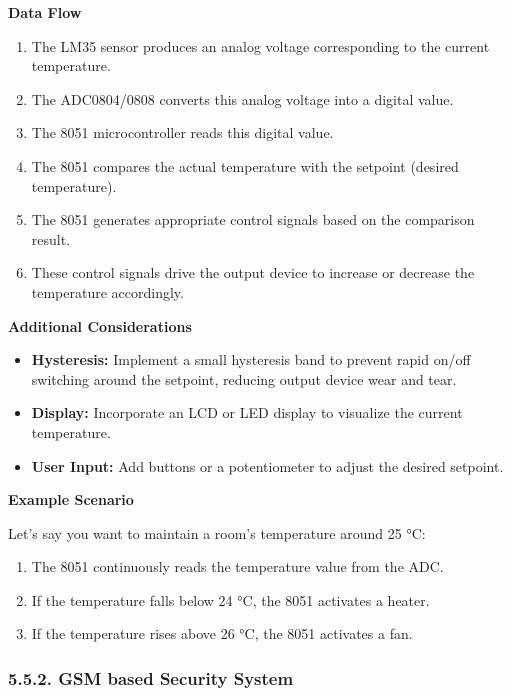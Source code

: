 \documentclass[
]{article}
\begin{document}
\textbf{Data Flow}

\begin{enumerate}
\def\labelenumi{\arabic{enumi}.}
\item
  The LM35 sensor produces an analog voltage corresponding to the
  current temperature.
\item
  The ADC0804/0808 converts this analog voltage into a digital value.
\item
  The 8051 microcontroller reads this digital value.
\item
  The 8051 compares the actual temperature with the setpoint (desired
  temperature).
\item
  The 8051 generates appropriate control signals based on the comparison
  result.
\item
  These control signals drive the output device to increase or decrease
  the temperature accordingly.
\end{enumerate}

\textbf{Additional Considerations}

\begin{itemize}
\item
  \textbf{Hysteresis:} Implement a small hysteresis band to prevent
  rapid on/off switching around the setpoint, reducing output device
  wear and tear.
\item
  \textbf{Display:} Incorporate an LCD or LED display to visualize the
  current temperature.
\item
  \textbf{User Input:} Add buttons or a potentiometer to adjust the
  desired setpoint.
\end{itemize}

\textbf{Example Scenario}

Let's say you want to maintain a room's temperature around 25 °C:

\begin{enumerate}
\def\labelenumi{\arabic{enumi}.}
\item
  The 8051 continuously reads the temperature value from the ADC.
\item
  If the temperature falls below 24 °C, the 8051 activates a heater.
\item
  If the temperature rises above 26 °C, the 8051 activates a fan.
\end{enumerate}

\hypertarget{552-gsm-based-security-system}{%
\subsubsection{5.5.2. GSM based Security
System}\label{552-gsm-based-security-system}}
\end{document}
